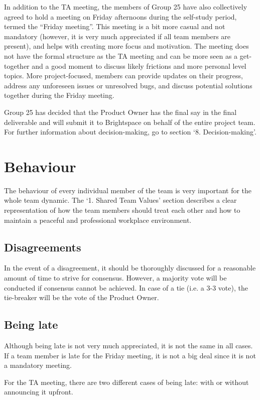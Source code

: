 \documentclass[sigconf,nonacm]{acmart}
\begin{document}
In addition to the TA meeting, the members of Group 25 have also collectively agreed to hold a meeting on Friday afternoons during the self-study period, termed the “Friday meeting”. This meeting is a bit more casual and not mandatory (however, it is very much appreciated if all team members are present), and helps with creating more focus and motivation. The meeting does not have the formal structure as the TA meeting and can be more seen as a get-together and a good moment to discuss likely frictions and more personal level topics. More project-focused, members can provide updates on their progress, address any unforeseen issues or unresolved bugs, and discuss potential solutions together during the Friday meeting.

Group 25 has decided that the Product Owner has the final say in the final deliverable and will submit it to Brightspace on behalf of the entire project team. For further information about decision-making, go to section ‘8. Decision-making’.


\section{Behaviour}
The behaviour of every individual member of the team is very important for the whole team dynamic. The ‘1. Shared Team Values’ section describes a clear representation of how the team members should treat each other and how to maintain a peaceful and professional workplace environment.

\subsection{Disagreements}
In the event of a disagreement, it should be thoroughly discussed for a reasonable amount of time to strive for consensus. However, a majority vote will be conducted if consensus cannot be achieved. In case of a tie (i.e. a 3-3 vote), the tie-breaker will be the vote of the Product Owner.

\subsection{Being late}
Although being late is not very much appreciated, it is not the same in all cases. If a team member is late for the Friday meeting, it is not a big deal since it is not a mandatory meeting.

For the TA meeting, there are two different cases of being late: with or without announcing it upfront.
\end{document}
